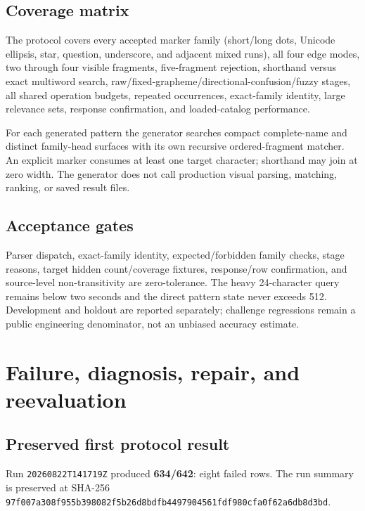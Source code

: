 \documentclass[10pt,oneside]{book}
\begin{document}
\section{Coverage matrix}

The protocol covers every accepted marker family (short/long dots, Unicode
ellipsis, star, question, underscore, and adjacent mixed runs), all four edge
modes, two through four visible fragments, five-fragment rejection, shorthand
versus exact multiword search, raw/fixed-grapheme/directional-confusion/fuzzy
stages, all shared operation budgets, repeated occurrences, exact-family
identity, large relevance sets, response confirmation, and loaded-catalog
performance.

\begin{methodbox}[title=Independent visual oracle]
For each generated pattern the generator searches compact complete-name and
distinct family-head surfaces with its own recursive ordered-fragment matcher.
An explicit marker consumes at least one target character; shorthand may join
at zero width. The generator does not call production visual parsing, matching,
ranking, or saved result files.
\end{methodbox}

\section{Acceptance gates}

Parser dispatch, exact-family identity, expected/forbidden family checks,
stage reasons, target hidden count/coverage fixtures, response/row confirmation,
and source-level non-transitivity are zero-tolerance. The heavy 24-character
query remains below two seconds and the direct pattern state never exceeds 512.
Development and holdout are reported separately; challenge regressions remain
a public engineering denominator, not an unbiased accuracy estimate.

\chapter{Failure, diagnosis, repair, and reevaluation}

\section{Preserved first protocol result}

Run \texttt{20260822T141719Z} produced \textbf{634/642}: eight failed rows.
The run summary is preserved at SHA-256
\texttt{97f007a308f955b398082f5b26d8bdfb4497904561fdf980cfa0f62a6db8d3bd}.
\end{document}
